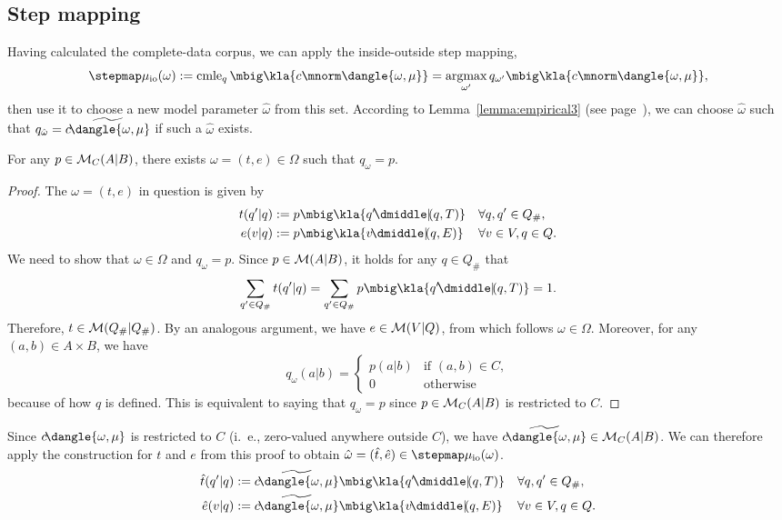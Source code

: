 \subsection{Step mapping}

Having calculated the complete-data corpus, we can apply the inside-outside
step mapping,
\[
 \stepmap\mu_\mathrm{io}(\omega) := \cmle_q\mbig\kla{c\mnorm\dangle{\omega,\mu}} = \argmax_{\omega'} q_{\omega'}\mbig\kla{c\mnorm\dangle{\omega,\mu}},
\]
then use it to choose a new model parameter $\hat\omega$ from this set.
According to Lemma~\ref{lemma:empirical3} (see
page~\pageref{lemma:empirical3}), we can choose $\hat\omega$ such that
$q_{\hat\omega} = \widetilde{c\!\dangle{\omega,\mu}}$ if such a
$\hat\omega$ exists.

\begin{lemma}
 For any $p\in\mathcal M_C(A|B)$, there exists $\omega=(t,e)\in\Omega$ such that $q_\omega = p$.
\end{lemma}

\begin{proof}
 The $\omega=(t,e)$ in question is given by
 \begin{align*}
  t(q'|q) &:= p\mbig\kla{q'\npipe(q,T)} &&\forall q,q'\in Q_\#, \\
  e(v|q) &:= p\mbig\kla{v\npipe(q,E)} &&\forall v\in V,q\in Q.
 \end{align*}
 We need to show that $\omega\in\Omega$ and $q_\omega=p$. Since $p\in\mathcal M(A|B)$,
 it holds for any $q\in Q_\#$ that
 \[
  \sum_{q'\in Q_\#} t(q'|q) = \sum_{q'\in Q_\#} p\mbig\kla{q'\npipe(q,T)} = 1.
 \]
 Therefore, $t\in\mathcal M(Q_\#|Q_\#)$. By an analogous argument, we have
 $e\in\mathcal M(V|Q)$, from which follows $\omega\in\Omega$. Moreover, for any
 $(a,b)\in A\times B$, we have
 \[
  q_\omega(a|b) = \begin{cases}
   p(a|b) & \text{if } (a,b)\in C, \\
   0 & \text{otherwise}
  \end{cases}
 \]
 because of how $q$ is defined. This is equivalent to saying that $q_\omega=p$
 since $p\in\mathcal M_C(A|B)$ is restricted to $C$.
\end{proof}

Since $c\!\dangle{\omega,\mu}$ is restricted to $C$ (i.~e., zero-valued
anywhere outside $C$), we have
$\widetilde{c\!\dangle{\omega,\mu}}\in\um_C(A|B)$. We can therefore apply the
construction for $t$ and $e$ from this proof to obtain $\hat\omega=(\hat t,\hat
e)\in\stepmap\mu_\mathrm{io}(\omega)$.
\begin{align*}
 \hat t(q'|q) &:= \widetilde{c\!\dangle{\omega,\mu}}\mbig\kla{q'\npipe(q,T)} &&\forall q,q'\in Q_\#, \\
 \hat e(v|q) &:= \widetilde{c\!\dangle{\omega,\mu}}\mbig\kla{v\npipe(q,E)} &&\forall v\in V,q\in Q.
\end{align*}


